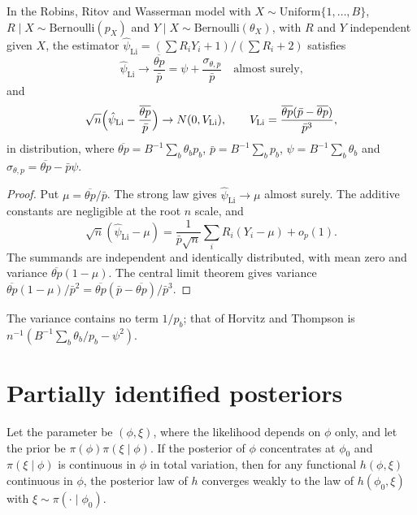 \begin{theorem}
In the Robins, Ritov and Wasserman model with $X \sim \mathrm{Uniform}\{1, \ldots, B\}$, $R \mid X \sim \mathrm{Bernoulli}(p_X)$ and $Y \mid X \sim \mathrm{Bernoulli}(\theta_X)$, with $R$ and $Y$ independent given $X$, the estimator $\hat\psi_{\mathrm{Li}} = (\sum R_iY_i + 1)/(\sum R_i + 2)$ satisfies
\[
\hat\psi_{\mathrm{Li}} \to \frac{\overline{\theta p}}{\bar p} = \psi + \frac{\sigma_{\theta,p}}{\bar p}
\quad\text{almost surely,}
\]
and
\[
\sqrt{n}\Bigl(\hat\psi_{\mathrm{Li}} - \frac{\overline{\theta p}}{\bar p}\Bigr) \to N(0, V_{\mathrm{Li}}), \qquad V_{\mathrm{Li}} = \frac{\overline{\theta p}(\bar p - \overline{\theta p})}{\bar p^3},
\]
in distribution, where $\overline{\theta p} = B^{-1}\sum_b\theta_bp_b$, $\bar p = B^{-1}\sum_b p_b$, $\psi = B^{-1}\sum_b\theta_b$ and $\sigma_{\theta,p} = \overline{\theta p} - \bar p\psi$.
\end{theorem}

\begin{proof}
Put $\mu=\overline{\theta p}/\bar p$. The strong law gives $\hat\psi_{\mathrm{Li}}\to\mu$ almost surely. The additive constants are negligible at the root $n$ scale, and
\[
\sqrt n(\hat\psi_{\mathrm{Li}}-\mu)=\frac1{\bar p\sqrt n}\sum_iR_i(Y_i-\mu)+o_p(1).
\]
The summands are independent and identically distributed, with mean zero and variance $\overline{\theta p}(1-\mu)$. The central limit theorem gives variance $\overline{\theta p}(1-\mu)/\bar p^2=\overline{\theta p}(\bar p-\overline{\theta p})/\bar p^3$.
\end{proof}

The variance contains no term $1/p_b$; that of Horvitz and Thompson is $n^{-1}(B^{-1}\sum_b\theta_b/p_b - \psi^2)$.

\section{Partially identified posteriors}

\begin{theorem}
Let the parameter be $(\phi, \xi)$, where the likelihood depends on $\phi$ only, and let the prior be $\pi(\phi)\pi(\xi \mid \phi)$. If the posterior of $\phi$ concentrates at $\phi_0$ and $\pi(\xi \mid \phi)$ is continuous in $\phi$ in total variation, then for any functional $h(\phi, \xi)$ continuous in $\phi$, the posterior law of $h$ converges weakly to the law of $h(\phi_0, \xi)$ with $\xi \sim \pi(\cdot \mid \phi_0)$.
\end{theorem}

